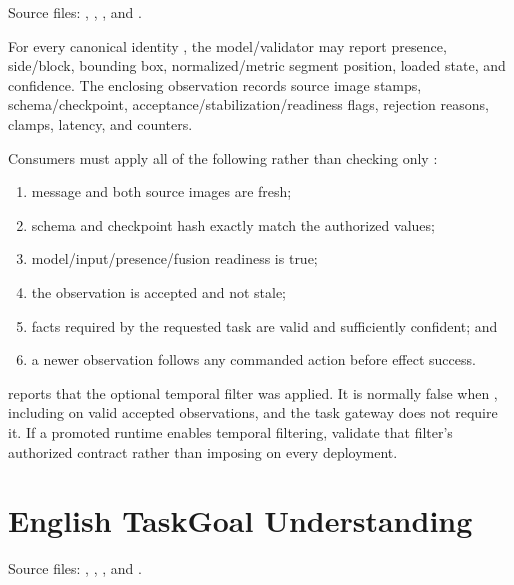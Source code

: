 Source files: ,
,
,
and .

For every canonical identity , the model/validator may
report presence, side/block, bounding box, normalized/metric segment position,
loaded state, and confidence. The enclosing observation records source image
stamps, schema/checkpoint, acceptance/stabilization/readiness flags, rejection
reasons, clamps, latency, and counters.

Consumers must apply all of the following rather than checking only
:

\begin{enumerate}
  \item message and both source images are fresh;
  \item schema and checkpoint hash exactly match the authorized values;
  \item model/input/presence/fusion readiness is true;
  \item the observation is accepted and not stale;
  \item facts required by the requested task are valid and sufficiently
        confident; and
  \item a newer observation follows any commanded action before effect success.
\end{enumerate}

 reports that the optional temporal filter was applied. It is
normally false when , including on valid
accepted observations, and the task gateway does not require it. If a promoted
runtime enables temporal filtering, validate that filter's authorized contract
rather than imposing  on every deployment.

\section{English TaskGoal Understanding}

Source files: ,
,
, and
.

